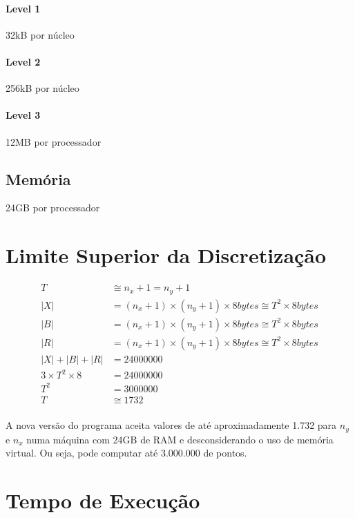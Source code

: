 \documentclass[12pt]{article}
\begin{document}
\paragraph{Level 1} 32kB por núcleo
\paragraph{Level 2} 256kB por núcleo
\paragraph{Level 3} 12MB por processador

\subsection{Memória}
24GB por processador

\newpage

\section{Limite Superior da Discretização}

\begin{align}
	T &\cong n_x + 1 = n_y + 1 \\
	|X| &= (n_x+1)\times(n_y+1)\times8 bytes \cong T^2\times8 bytes \\
	|B| &= (n_x+1)\times(n_y+1)\times8 bytes \cong T^2\times8 bytes \\
	|R| &= (n_x+1)\times(n_y+1)\times8 bytes \cong T^2\times8 bytes \\
	|X| + |B| + |R| &= 24000000 \\
	3\times T^2\times8 &= 24000000 \\
	T^2 &= 3000000\\
	T &\cong 1732
\end{align}

\paragraph{}
A nova versão do programa aceita valores de até aproximadamente 1.732 para $n_y$ e $n_x$ numa máquina com 24GB de RAM e desconsiderando o uso de memória virtual.
Ou seja, pode computar até 3.000.000 de pontos.

\newpage

\section{Tempo de Execução}
\end{document}
